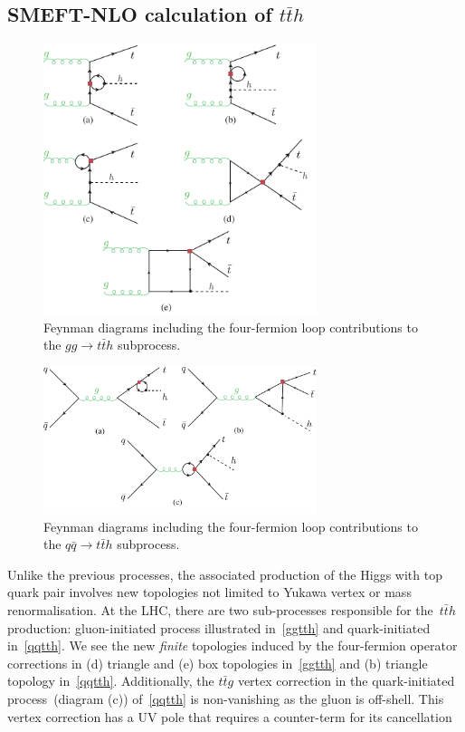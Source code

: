 	\subsection{SMEFT-NLO calculation of  $t\bar th$}
	\begin{figure}[h!]
		\centering
		\includegraphics[width=8cm]{./fig/ggttH-4F_NLO}
		\caption{Feynman diagrams including the four-fermion loop contributions to the $ gg \to t\bar{t} h$ subprocess.}
		\label{ggtth}
	\end{figure}
	\begin{figure}[hth]
		\centering
		\includegraphics[width=8cm]{./fig/qqttH-4F_NLO}
		\caption{Feynman diagrams including the four-fermion loop contributions to the  $ q \bar{q} \to t\bar{t} h$ subprocess.}
		\label{qqtth}
	\end{figure}
	\par Unlike the previous processes, the associated production of the Higgs with top quark pair involves new topologies not limited to Yukawa vertex or mass renormalisation.  At the LHC, there are two sub-processes responsible for the~$t\bar t h$ production: gluon-initiated process illustrated in~\autoref{ggtth} and quark-initiated in~\autoref{qqtth}. We see the new \emph{finite} topologies induced by the four-fermion operator corrections in (d) triangle and (e) box topologies in~\autoref{ggtth} and (b) triangle topology in~\autoref{qqtth}.  Additionally, the $t\bar t g$ vertex correction in the quark-initiated process~(diagram (c)) of~\autoref{qqtth} is non-vanishing as the gluon is off-shell. This vertex correction has a UV pole that requires a counter-term for its cancellation
